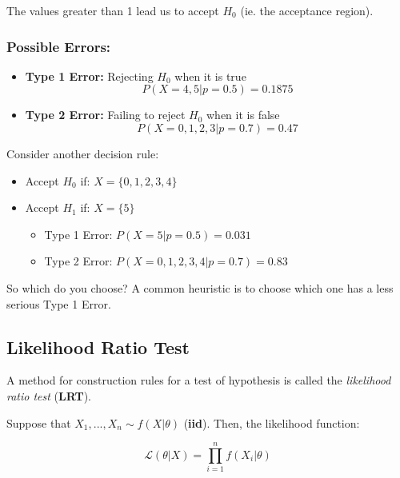 \documentclass{article}
\begin{document}
The values greater than 1 lead us to accept $H_0$ (ie. the acceptance region).

\subsubsection{Possible Errors:}

\begin{itemize}
    \item \textbf{Type 1 Error:} Rejecting $H_0$ when it is true
    \begin{equation*}
        P(X=4,5|p=0.5) = 0.1875
    \end{equation*}
    
    \item \textbf{Type 2 Error:} Failing to reject $H_0$ when it is false
    \begin{equation*}
        P(X=0,1,2,3|p=0.7) = 0.47
    \end{equation*}
\end{itemize}

\noindent Consider another decision rule:

\begin{itemize}
    \item Accept $H_0$ if: $X = \{0,1,2,3,4\}$
    \item Accept $H_1$ if: $X = \{5\}$
    
    \begin{itemize}
        \item Type 1 Error: $P(X=5|p=0.5) = 0.031$
        \item Type 2 Error: $P(X=0,1,2,3,4|p=0.7) = 0.83$
    \end{itemize}
\end{itemize}

\noindent So which do you choose? A common heuristic is to choose which one has a less serious Type 1 Error.

\subsection{Likelihood Ratio Test}

A method for construction rules for a test of hypothesis is called the \textit{likelihood ratio test} (\textbf{LRT}).

Suppose that $X_1,...,X_n \sim f(X|\theta)$ (\textbf{iid}). Then, the likelihood function:

\begin{equation*}
    \mathcal{L}(\theta|X) = \prod_{i=1}^n f(X_i|\theta)
\end{equation*}
\end{document}
